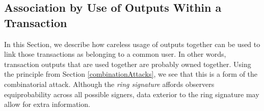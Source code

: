 \documentclass[12pt,english]{mrl}
\theoremstyle{definition}
\numberwithin{equation}{section}
\numberwithin{figure}{section}
\numberwithin{equation}{section}
\numberwithin{equation}{section}
\numberwithin{figure}{section}
\begin{document}

\subsection{Association by Use of Outputs Within a Transaction}\label{associationByUse}

In this Section, we describe how careless usage of outputs together can be used to link those transactions as belonging to a common user. In other words, transaction outputs that are used together are probably owned together. Using the principle from Section \ref{combinationAttacks}, we see that this is a form of the combinatorial attack. Although the \textit{ring signature} affords observers equiprobability across all possible signers, data exterior to the ring signature may allow for extra information.
\end{document}
